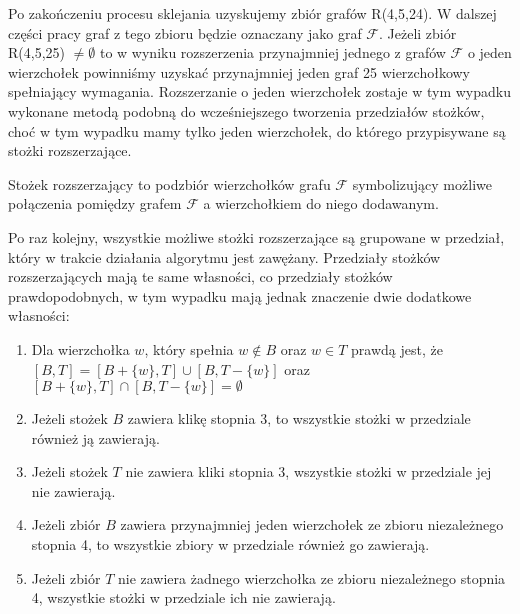 Po zakończeniu procesu sklejania uzyskujemy zbiór grafów R(4,5,24). W dalszej części pracy graf z tego zbioru będzie oznaczany jako graf $\mathcal{F}$. Jeżeli zbiór R(4,5,25) $\neq \emptyset$ to w wyniku rozszerzenia przynajmniej jednego z grafów $\mathcal{F}$ o jeden wierzchołek powinniśmy uzyskać przynajmniej jeden graf 25 wierzchołkowy spełniający wymagania. 
Rozszerzanie o jeden wierzchołek zostaje w tym wypadku wykonane metodą podobną do wcześniejszego tworzenia przedziałów stożków, choć w tym wypadku mamy tylko jeden wierzchołek, do którego przypisywane są stożki rozszerzające.
\begin{definition} Stożek rozszerzający to podzbiór wierzchołków grafu $\mathcal{F}$ symbolizujący możliwe połączenia pomiędzy grafem $\mathcal{F}$ a wierzchołkiem do niego dodawanym.
\end{definition}

Po raz kolejny, wszystkie możliwe stożki rozszerzające są grupowane w przedział, który w trakcie działania algorytmu jest zawężany. Przedziały stożków rozszerzających mają te same własności, co przedziały stożków prawdopodobnych, w tym wypadku mają jednak znaczenie dwie dodatkowe własności:

\begin{enumerate}
\item Dla wierzchołka $w$, który spełnia $w \notin B$ oraz $w\in T$ prawdą jest, że $[B, T] = [B + \{ w\}, T] \cup [B , T - \{ w\}]$ oraz $[B +\{ w\}, T] \cap [B , T - \{ w\}] = \emptyset$

\item Jeżeli stożek $B$ zawiera klikę stopnia 3, to wszystkie stożki w przedziale również ją zawierają. 

\item Jeżeli stożek $T$ nie zawiera kliki stopnia 3, wszystkie stożki w przedziale jej nie zawierają.

																													  
				 
\item Jeżeli zbiór $B$ zawiera przynajmniej jeden wierzchołek ze zbioru niezależnego stopnia 4, to wszystkie zbiory w przedziale również go zawierają. 

\item Jeżeli zbiór $T$ nie zawiera żadnego wierzchołka ze zbioru niezależnego stopnia 4, wszystkie stożki w przedziale ich nie zawierają.
\end {enumerate}



